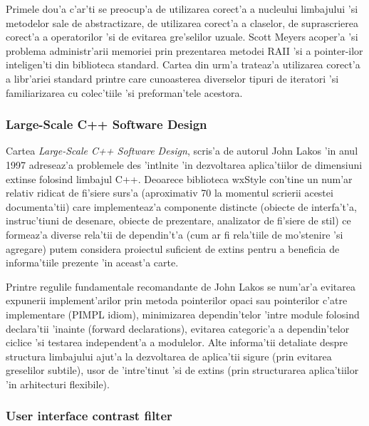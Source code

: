 \medskip

Primele dou'a c'ar'ti se preocup'a de utilizarea corect'a a nucleului limbajului 'si metodelor sale de abstractizare, de utilizarea corect'a a claselor, de suprascrierea corect'a a operatorilor 'si de evitarea gre'selilor uzuale. Scott Meyers acoper'a 'si problema administr'arii memoriei prin prezentarea metodei RAII 'si a pointer-ilor inteligen'ti din biblioteca standard. Cartea din urm'a trateaz'a utilizarea corect'a a libr'ariei standard printre care cunoasterea diverselor tipuri de iteratori 'si familiarizarea cu colec'tiile 'si preforman'tele acestora.

\subsubsection{Large-Scale C++ Software Design}

Cartea \emph{Large-Scale C++ Software Design}\cite{largescalecpp}, scris'a de autorul John Lakos 'in anul 1997 adreseaz'a problemele des 'int{\ia}lnite 'in dezvoltarea aplica'tiilor de dimensiuni extinse folosind limbajul C++. Deoarece biblioteca wxStyle con'tine un num'ar relativ ridicat de fi'siere surs'a (aproximativ 70 la momentul scrierii acestei documenta'tii) care implementeaz'a componente distincte (obiecte de interfa't'a, instruc'tiuni de desenare, obiecte de prezentare, analizator de fi'siere de stil) ce formeaz'a diverse rela'tii de dependin't'a (cum ar fi rela'tiile de mo'stenire 'si agregare) putem considera proiectul suficient de extins pentru a beneficia de informa'tiile prezente 'in aceast'a carte.

\medskip

Printre regulile fundamentale recomandante de John Lakos se num'ar'a evitarea expunerii implement'arilor prin metoda pointerilor opaci sau pointerilor c'atre implementare (PIMPL idiom), minimizarea dependin'telor 'intre module folosind declara'tii 'inainte (forward declarations), evitarea categoric'a a dependin'telor ciclice 'si testarea independent'a a modulelor. Alte informa'tii detaliate despre structura limbajului ajut'a la dezvoltarea de aplica'tii sigure (prin evitarea greselilor subtile), usor de 'intre'tinut 'si de extins (prin structurarea aplica'tiilor 'in arhitecturi flexibile).

\subsubsection{User interface contrast filter}

